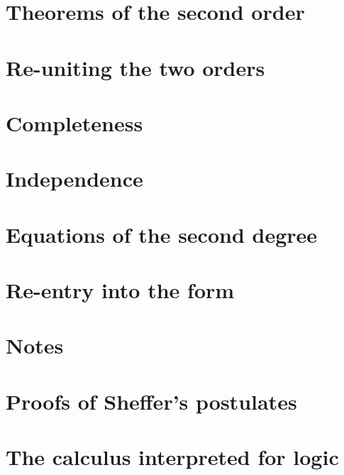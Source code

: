\documentclass[11pt, a4paper]{book}
\begin{document}
\newpage
\section{Theorems of the second order}

\newpage
\section{Re-uniting the two orders}

\newpage
\section{Completeness}

\newpage
\section{Independence}

\newpage
\section{Equations of the second degree}

\newpage
\section{Re-entry into the form}

\newpage
\section*{Notes}

\newpage
\appendix
\section{Proofs of Sheffer's postulates}
\section{The calculus interpreted for logic}
\end{document}
